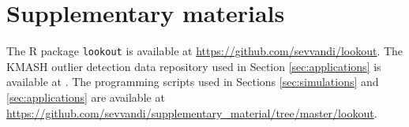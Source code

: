 \documentclass[12pt]{article}
\theoremstyle{definition}
\theoremstyle{definition}
\theoremstyle{definition}
\theoremstyle{definition}
\theoremstyle{remark}
\begin{document}
\hypertarget{sec:suppmat}{%
\section{Supplementary materials}\label{sec:suppmat}}

The R package \texttt{lookout} is available at \url{https://github.com/sevvandi/lookout}.
The KMASH outlier detection data repository used in Section \ref{sec:applications} is available at \citet{datasets}.
The programming scripts used in Sections \ref{sec:simulations} and \ref{sec:applications} are available at \url{https://github.com/sevvandi/supplementary_material/tree/master/lookout}.



\end{document}

